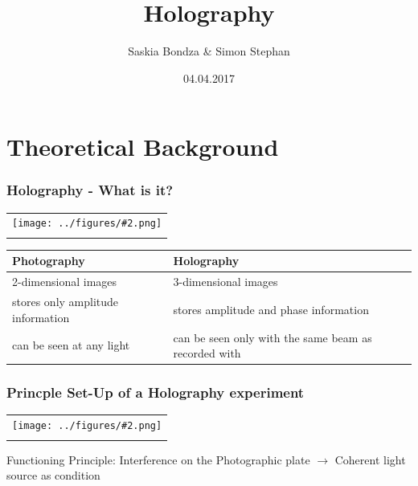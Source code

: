 \documentclass[10pt]{beamer}
\title{Holography}
\author{Saskia Bondza \& Simon Stephan}
\date{04.04.2017}
\newcommand{\gra}[3][]{
	\begin{table}
	\centering
	\begin{tabular}[width=\textwidth]{c}
		\texttt{[image: ../figures/\#2.png]}\\
		\small #3
	\end{tabular}
	\end{table}
}
\begin{document}
\maketitle
\frame{\tableofcontents}
\section{Theoretical Background}
\frame{\tableofcontents[currentsection]}
\begin{frame}
	\frametitle{Holography - What is it?}
	\gra[0.35]{holo-schach}{}
		\begin{tabular}{p{5cm}|p{5cm}}
			\textbf{Photography}&\textbf{Holography}\\\hline
			2-dimensional images&3-dimensional images\\\hline
			stores only amplitude information&stores amplitude and phase information\\\hline
			can be seen at any light&can be seen only with the same beam as recorded with
		\end{tabular}
\end{frame}

\begin{frame}
	\frametitle{Princple Set-Up of a Holography experiment}
	\gra[0.8]{PrincipleSetUp}{}
	Functioning Principle: Interference on the Photographic plate $\rightarrow$ Coherent light source as condition
\end{frame}

\end{document}
